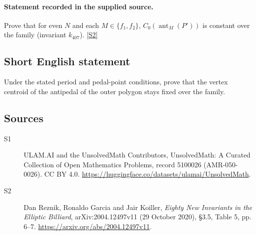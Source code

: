 \documentclass[11pt]{article}
\newcommand{\sref}[2]{\hyperlink{source:#1:#2}{[S#2]}}
\begin{document}
\paragraph{Statement recorded in the supplied source.}
Prove that for even $N$ and each $M\in\{f_1,f_2\}$, $C_0(\operatorname{ant}_M(P'))$ is constant over the family (invariant $k_{407}$). \sref{5100026}{2}
\subsection{Short English statement}
Under the stated period and pedal-point conditions, prove that the vertex centroid of the antipedal of the outer polygon stays fixed over the family.
\subsection{Sources}
\begin{description}
\item[\hypertarget{source:5100026:1}{S1}] ULAM.AI and the UnsolvedMath Contributors, UnsolvedMath: A Curated Collection of Open Mathematics Problems, record 5100026 (AMR-050-0026). CC BY 4.0. \url{https://huggingface.co/datasets/ulamai/UnsolvedMath}.
\item[\hypertarget{source:5100026:2}{S2}] Dan Reznik, Ronaldo Garcia and Jair Koiller, \emph{Eighty New Invariants in the Elliptic Billiard}, arXiv:2004.12497v11 (29 October 2020), \S3.5, Table 5, pp. 6--7. \url{https://arxiv.org/abs/2004.12497v11}.
\end{description}
\label{end:5100026}
\end{document}
